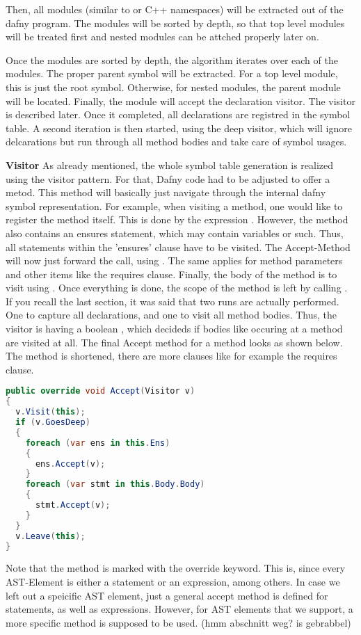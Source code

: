 Then, all modules (similar to \Csharp or C++ namespaces) will be extracted out of the dafny program. The modules will be sorted by depth, so that top level modules will be treated first and nested modules can be attched properly later on.

Once the modules are sorted by depth, the algorithm iterates over each of the modules. The proper parent symbol will be extracted. For a top level module, this is just the root symbol. Otherwise, for nested modules, the parent module will be located. Finally, the module will accept the declaration visitor. The visitor is described later. Once it completed, all declarations are registred in the symbol table. A second iteration is then started, using the deep visitor, which will ignore delcarations but run through all method bodies and take care of symbol usages.

\textbf{Visitor}
As already mentioned, the whole symbol table generation is realized using the visitor pattern. For that, Dafny code had to be adjusted to offer a  metod. This method will basically just navigate through the internal dafny symbol representation. For example, when visiting a method, one would like to register the method itself. This is done by the expression . However, the method also contains an ensures statement, which may contain variables or such. Thus, all statements within the 'ensures' clause have to be visited. The Accept-Method will now just forward the call, using . The same applies for method parameters and other items like the requires clause. Finally, the body of the method is to visit using . Once everything is done, the scope of the method is left by calling .\\

If you recall the last section, it was said that two runs are actually performed. One to capture all declarations, and one to visit all method bodies. Thus, the visitor is having a boolean , which decideds if bodies like occuring at a method are visited at all. The final Accept method for a method looks as shown below. The method is shortened, there are more clauses like for example the requires clause.


\begin{lstlisting}[language=csharp, caption={Accepting a Visitor}, captionpos=b, label={lst:visitoraccept}]
public override void Accept(Visitor v)
{
  v.Visit(this);
  if (v.GoesDeep)
  {
    foreach (var ens in this.Ens)
    {
      ens.Accept(v);
    }        
    foreach (var stmt in this.Body.Body)
    {
      stmt.Accept(v);
    }
  }
  v.Leave(this);
}
\end{lstlisting}
Note that the method is marked with the override keyword. This is, since every AST-Element is either a statement or an expression, among others. In case we left out a speicific AST element, just a general accept method is defined for statements, as well as expressions. However, for AST elements that we support, a more specific method is supposed to be used. (hmm abschnitt weg? is gebrabbel)


